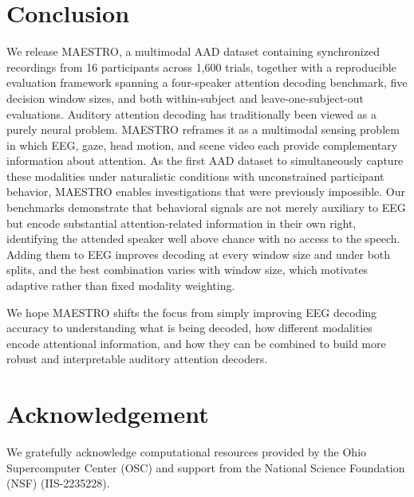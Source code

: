 \documentclass[journal]{IEEEtran}
\begin{document}
\section{Conclusion} \label{conclusion}
We release MAESTRO, a multimodal AAD dataset containing synchronized recordings from 16 participants across 1,600 trials, together with a reproducible evaluation framework spanning a four-speaker attention decoding benchmark, five decision window sizes, and both within-subject and leave-one-subject-out evaluations. Auditory attention decoding has traditionally been viewed as a purely neural problem. MAESTRO reframes it as a multimodal sensing problem in which EEG, gaze, head motion, and scene video each provide complementary information about attention. As the first AAD dataset to simultaneously capture these modalities under naturalistic conditions with unconstrained participant behavior, MAESTRO enables investigations that were previously impossible.
%
Our benchmarks demonstrate that behavioral signals are not merely auxiliary to EEG but encode substantial attention-related information in their own right, identifying the attended speaker well above chance with no access to the speech. Adding them to EEG improves decoding at every window size and under both splits, and the best combination varies with window size, which motivates adaptive rather than fixed modality weighting.

We hope MAESTRO shifts the focus from simply improving EEG decoding accuracy to understanding what is being decoded, how different modalities encode attentional information, and how they can be combined to build more robust and interpretable auditory attention decoders.

\section{Acknowledgement}

We gratefully acknowledge computational resources provided by the Ohio Supercomputer Center (OSC) and support from the National Science Foundation (NSF) (IIS-2235228).




 
\end{document}
